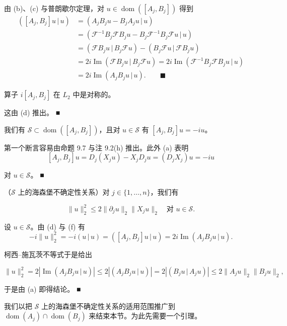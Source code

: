 \begin{remark}
\begin{items}
\proofhead
由 (b)、(c) 与普朗歇尔定理，对 $ u \in \operatorname{dom}([A_j,B_j]) $ 得到
\begin{equation*}
\begin{aligned}
([A_j,B_j]u\,|\,u) &= (A_jB_j u - B_jA_j u\,|\,u) \\ &= (\mathcal{F}^{-1}B_j\mathcal{F}B_j u - B_j\mathcal{F}^{-1}B_j\mathcal{F}u\,|\,u) \\ &= (\mathcal{F}B_j u\,|\,B_j\mathcal{F}u) - (B_j\mathcal{F}u\,|\,\mathcal{F}B_j u) \\ &= 2i\operatorname{Im}(\mathcal{F}B_j u\,|\,B_j\mathcal{F}u) = 2i\operatorname{Im}(\mathcal{F}^{-1}B_j\mathcal{F}B_j u\,|\,u) \\ &= 2i\operatorname{Im}(A_jB_j u\,|\,u) . \qquad \blacksquare
\end{aligned}
\end{equation*}
\item

算子 $ i[A_j,B_j] $ 在 $ L_2 $ 中是对称的。

\proofhead
这由 (d) 推出。 \nobreak\hspace{0.35em}■
\item

我们有 $ \mathcal{S} \subset \operatorname{dom}([A_j,B_j]) $，且对 $ u \in \mathcal{S} $ 有 $ [A_j,B_j]u = -iu $。

\proofhead
第一个断言容易由命题 9.7 与注 9.2(h) 推出。此外 (a) 表明
\[
[A_j,B_j]u = D_j(X_j u) - X_j D_j u = (D_j X_j)u = -iu
\]

对 $ u \in \mathcal{S} $。 \nobreak\hspace{0.35em}■

\item

（$ \mathcal{S} $ 上的海森堡不确定性关系）对 $ j \in \{1,\ldots,n\} $，我们有

\[
\|u\|_2^2 \le 2\|\partial_j u\|_2 \|X_j u\|_2 \quad \text{对 } u \in \mathcal{S} .
\]

\proofhead
设 $ u \in \mathcal{S} $。由 (d) 与 (f) 有
\[
-i\|u\|_2^2 = -i(u\,|\,u) = ([A_j,B_j]u\,|\,u) = 2i\operatorname{Im}(A_jB_j u\,|\,u) .
\]

柯西–施瓦茨不等式于是给出

\[
\|u\|_2^2 = 2\left|\operatorname{Im}(A_jB_j u\,|\,u)\right| \le 2\left|(A_jB_j u\,|\,u)\right| = 2\left|(B_j u\,|\,A_j u)\right| \le 2\|A_j u\|_2 \|B_j u\|_2 ,
\]

于是由 (a) 即得结论。 \nobreak\hspace{0.35em}■

\end{items}

我们以把 $ \mathcal{S} $ 上的海森堡不确定性关系的适用范围推广到 $ \operatorname{dom}(A_j) \cap \operatorname{dom}(B_j) $ 来结束本节。为此先需要一个引理。

\end{remark}

